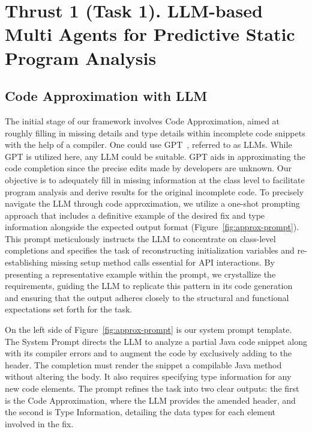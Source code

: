 \section{Thrust 1 (Task 1). LLM-based Multi Agents for Predictive Static Program Analysis}
\label{sec:thrust1}


\subsection{Code Approximation with LLM}



% 

The initial stage of our framework involves Code Approximation, aimed at roughly filling in missing details and type details within incomplete code snippets with the help of a compiler. One could use GPT~\cite{ChatGPT}, referred to as LLMs. While GPT is utilized here, any LLM could be suitable. GPT aids in approximating the code completion since the precise edits made by developers are unknown. Our objective is to adequately fill in missing information at the class level to facilitate program analysis and derive results for the original incomplete code.
%
To precisely navigate the LLM through code approximation, we utilize a one-shot prompting approach that includes a definitive example of the desired fix and type information alongside the expected output format (Figure~\ref{fig:approx-prompt}). This prompt meticulously instructs the LLM to concentrate on class-level completions and specifies the task of reconstructing initialization variables and re-establishing missing setup method calls essential for API interactions. By presenting a representative example within the prompt, we crystallize the requirements, guiding the LLM to replicate this pattern in its code generation and ensuring that the output adheres closely to the structural and functional expectations set forth for the task.

On the left side of Figure~\ref{fig:approx-prompt} is our system prompt template. The System Prompt directs the LLM to analyze a partial Java code snippet along with its compiler errors and to augment the code by exclusively adding to the header. The completion must render the snippet a compilable Java method without altering the body. It also requires specifying type information for any new code elements. The prompt refines the task into two clear outputs: the first is the Code Approximation, where the LLM provides the amended header, and the second is Type Information, detailing the data types for each element involved in the fix.

